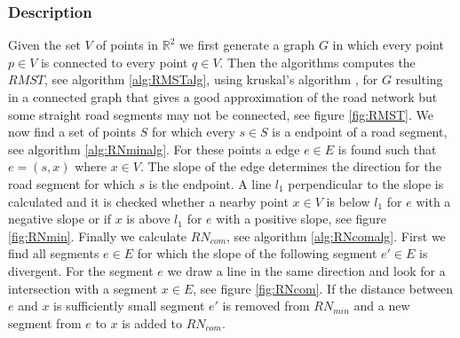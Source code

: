 \documentclass[11pt]{article}
\begin{document}
\subsubsection{Description}
Given the set $V$ of points in $\mathbb{R}^2$ we first generate a graph $G$ in which every point $p\in V$ is connected to every point $q \in V$. Then the algorithms computes the $RMST$, see algorithm \ref{alg:RMSTalg}, using kruskal's algorithm \cite{k-osssgtsp-56}, for $G$ resulting in a connected graph that gives a good approximation of the road network but some straight road segments may not be connected, see figure \ref{fig:RMST}. We now find a set of points $S$ for which every $s \in S$ is a endpoint of a road segment, see algorithm \ref{alg:RNminalg}. For these points a edge $e \in E$ is found such that $e=(s,x)$ where $x \in V$. The slope of the edge determines the direction for the road segment for which $s$ is the endpoint. A line $l_1$ perpendicular to the slope is calculated and it is checked whether a nearby point $x \in V$ is below $l_1$ for $e$ with a negative slope or if $x$ is above $l_1$ for $e$ with a positive slope, see figure \ref{fig:RNmin}. Finally we calculate $RN_{com}$, see algorithm \ref{alg:RNcomalg}. First we find all segments $e \in E$ for which the slope of the following segment $e' \in E$ is divergent. For the segment $e$ we draw a line in the same direction and look for a intersection with a segment $x \in E$, see figure \ref{fig:RNcom}. If the distance between $e$ and $x$ is sufficiently small segment $e'$ is removed from $RN_{min}$ and a new segment from $e$ to $x$ is added to $RN_{com}$.
\\
\end{document}

